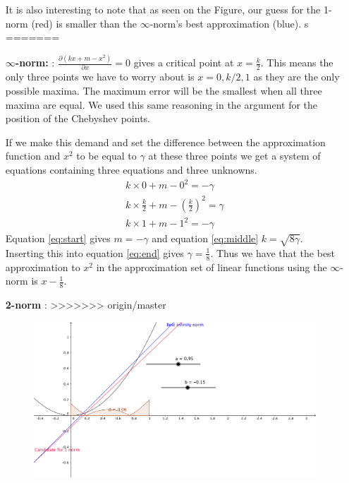\begin{solution}
\begin{enumerate}
It is also interesting to note that as seen on the Figure, our guess for the 1-norm (red) is smaller than the $\infty$-norm's best approximation (blue).
s
=======
  \item [{\bf $\infty$-norm: }]:
    $\frac{\partial (kx + m - x^2)}{\partial x} = 0$ gives a critical
    point at $x = \frac{k}{2}$. This means the only three points we
    have to worry about is $x = 0, k/2, 1$ as they are the only
    possible maxima. The maximum error will be the smallest when all
    three maxima are equal. We used this same reasoning in the
    argument for the position of the Chebyshev points.

    If we make this demand and set the difference between the
    approximation function and $x^2$ to be equal to $\gamma$ at these
    three points we get a system of equations containing three
    equations and three unknowns.
    \begin{align}
      k \times 0  + m  - 0^2  = -\gamma \label{eq:start}\\
      k \times \frac{k}{2}  + m - \left(\frac{k}{2}\right)^2  = \gamma
      \label{eq:middle}\\
      k \times 1  + m  - 1^2   = -\gamma \label{eq:end}
    \end{align}
    Equation \ref{eq:start} gives $m = - \gamma$ and equation
    \ref{eq:middle} $k = \sqrt{8\gamma}$. Inserting this into equation
    \ref{eq:end} gives $\gamma = \frac{1}{8}$. Thus we have that the
    best approximation to $x^2$ in the approximation set of linear
    functions using the $\infty$-norm is $x - \frac{1}{8}$.
    
  \item [{\bf 2-norm}]:
>>>>>>> origin/master
    \begin{figure}[!ht]
      \centering
      \includegraphics[scale = 0.2]{task7.png}
      \label{fig:task_7}
    \end{figure}

\end{enumerate}
\end{solution}

 	

